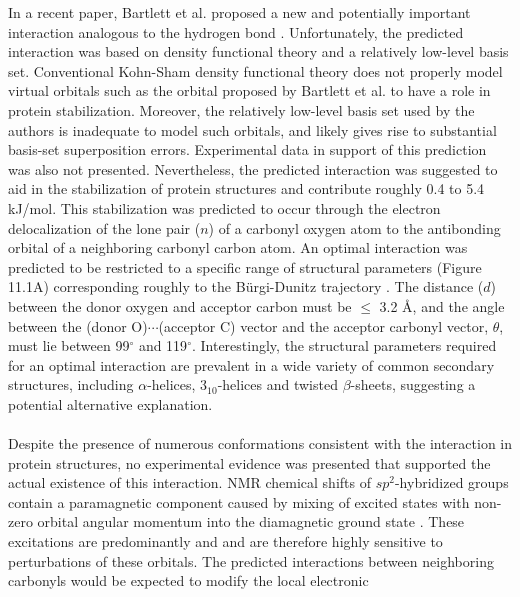 \begin{doublespace}
In a recent paper, Bartlett et al. proposed a new and potentially
important interaction analogous to the hydrogen bond
\cite{bartlett:ncb2010}. Unfortunately, the predicted \npistar{}
interaction was based on density functional theory and a relatively low-level
basis set. Conventional Kohn-Sham density functional theory does not properly
model virtual orbitals  \cite{mera:physrev2009} such as the \pistar{}
orbital proposed by Bartlett et al. to have a role in protein stabilization.
Moreover, the relatively low-level basis set used by the authors is inadequate
to model such orbitals, and likely gives rise to substantial basis-set
superposition errors. Experimental data in support of this prediction was also
not presented. Nevertheless, the predicted \npistar{} interaction was suggested
to aid in the stabilization of protein structures and contribute roughly 0.4
to 5.4 kJ/mol. This stabilization was predicted to occur through the electron
delocalization of the lone pair ($n$) of a carbonyl oxygen atom to the
antibonding \pistar{} orbital of a neighboring carbonyl carbon atom. An
optimal \npistar{} interaction was predicted to be restricted to a specific
range of structural parameters (Figure 11.1A) corresponding roughly to the
B\"{u}rgi-Dunitz trajectory \cite{burgi:jacs1973}.
The distance ($d$) between the donor oxygen and acceptor
carbon must be $\leq$ 3.2 \r{A}, and the angle between the
(donor O)$\cdots$(acceptor C) vector and the acceptor carbonyl vector,
$\theta$, must lie between 99$^\circ$ and 119$^\circ$. Interestingly, the
structural parameters required for an optimal \npistar{} interaction are
prevalent in a wide variety of common secondary structures, including
$\alpha$-helices, $3_{10}$-helices and twisted $\beta$-sheets, suggesting
a potential alternative explanation.
\\\\
Despite the presence of numerous conformations consistent with the \npistar{}
interaction in protein structures, no experimental evidence was presented
that supported the actual existence of this interaction. NMR chemical shifts of
$sp^2$-hybridized groups contain a paramagnetic component caused by mixing of
excited states with non-zero orbital angular momentum into the diamagnetic
ground state \cite{ramsey:physrev1950}. These excitations are
predominantly \npistar{} and \pipistar{} and are therefore highly sensitive to
perturbations of these orbitals. The predicted \npistar{} interactions between
neighboring carbonyls would be expected to modify the local electronic

\end{doublespace}
